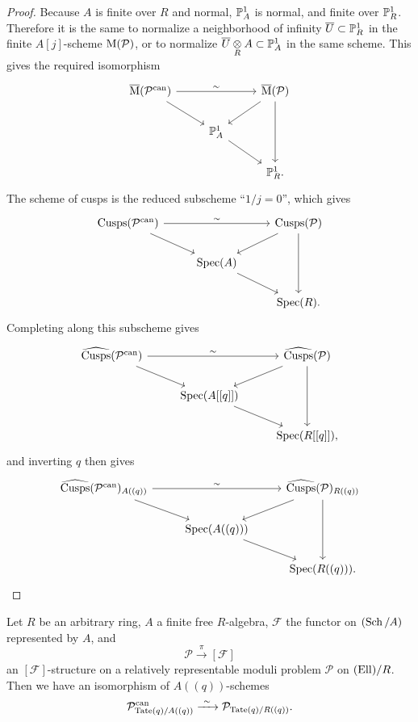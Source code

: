 \begin{proof}
Because $A$ is finite over $R$ and normal, $\mathbb{P}^1_A$ is normal, and finite over $\mathbb{P}^1_R$. Therefore it is the same to normalize a neighborhood of infinity $\overline{U} \subset \mathbb{P}^1_R$ in the finite $A[j]$-scheme $\mathrm{M}(\mathcal{P})$, or to normalize $\overline{U} \underset{R}{\otimes} A \subset \mathbb{P}^1_A$ in the same scheme. This gives the required isomorphism
\[
\begin{tikzcd}[row sep=1.8em, column sep=2.5em]
\overline{\Mcoarse}(\mathcal{P}^{\mathrm{can}}) \arrow[rr, "\sim"] \arrow[rd] & & \overline{\Mcoarse}(\mathcal{P}) \arrow[ld] \arrow[dd] \\
& \PP^1_A \arrow[rd] & \\
& & \PP^1_R .
\end{tikzcd}
\]
The scheme of cusps is the reduced subscheme ``$1/j = 0$'', which gives
\[
\begin{tikzcd}[row sep=1.8em, column sep=2.5em]
\mathrm{Cusps}(\mathcal{P}^{\mathrm{can}}) \arrow[rr, "\sim"] \arrow[rd] & & \mathrm{Cusps}(\mathcal{P}) \arrow[ld] \arrow[dd] \\
& \Spec(A) \arrow[rd] & \\
& & \Spec(R) .
\end{tikzcd}
\]
Completing along this subscheme gives
\[
\begin{tikzcd}[row sep=1.8em, column sep=2.5em]
\widehat{\mathrm{Cusps}}(\mathcal{P}^{\mathrm{can}}) \arrow[rr, "\sim"] \arrow[rd] & & \widehat{\mathrm{Cusps}}(\mathcal{P}) \arrow[ld] \arrow[dd] \\
& \Spec(A[[q]]) \arrow[rd] & \\
& & \Spec(R[[q]]) ,
\end{tikzcd}
\]
and inverting $q$ then gives
\[
\begin{tikzcd}[row sep=1.8em, column sep=2.5em]
\widehat{\mathrm{Cusps}}(\mathcal{P}^{\mathrm{can}})_{A((q))} \arrow[rr, "\sim"] \arrow[rd] & & \widehat{\mathrm{Cusps}}(\mathcal{P})_{R((q))} \arrow[ld] \arrow[dd] \\
& \Spec(A((q))) \arrow[rd] & \\
& & \Spec(R((q))) .
\end{tikzcd} \qedhere
\]
\end{proof}

\begin{kprop}\label{prop:9.3.2}
Let $R$ be an arbitrary ring, $A$ a finite free $R$-algebra, $\mathcal{F}$ the functor on $(\operatorname{Sch}/A)$ represented by $A$, and
\[
\mathcal{P} \xrightarrow{\ \pi\ } [\mathcal{F}]
\]
an $[\mathcal{F}]$-structure on a relatively representable moduli problem $\mathcal{P}$ on $(\mathrm{Ell})/R$. Then we have an isomorphism of $A((q))$-schemes
\[
\mathcal{P}^{\mathrm{can}}_{\mathrm{Tate}(q)/A((q))} \xrightarrow{\ \sim\ } \mathcal{P}_{\mathrm{Tate}(q)/R((q))} .
\]
\end{kprop}

